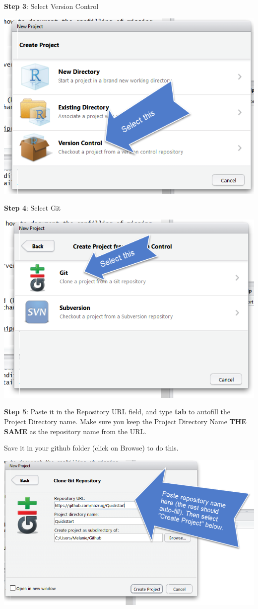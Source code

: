 \documentclass[]{book}
\begin{document}
\textbf{Step 3}: Select Version Control

\includegraphics{img/new_project_2.png}

\textbf{Step 4}: Select Git

\includegraphics{img/new_project_3.png}

\textbf{Step 5}: Paste it in the Repository URL field, and type \textbf{tab} to autofill the Project Directory name. Make sure you keep the Project Directory Name \textbf{THE SAME} as the repository name from the URL.

Save it in your github folder (click on Browse) to do this.

\includegraphics{img/new_project_4.png}
\end{document}
